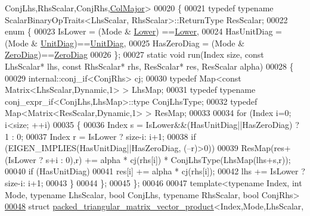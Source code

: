 \begin{DoxyCode}
      ConjLhs,RhsScalar,ConjRhs,\hyperlink{group__enums_ggaacded1a18ae58b0f554751f6cdf9eb13a0cbd4bdd0abcfc0224c5fcb5e4f6669a}{ColMajor}>
00020 \{
00021   \textcolor{keyword}{typedef} \textcolor{keyword}{typename} ScalarBinaryOpTraits<LhsScalar, RhsScalar>::ReturnType ResScalar;
00022   \textcolor{keyword}{enum} \{
00023     IsLower     = (Mode & \hyperlink{group__enums_gga39e3366ff5554d731e7dc8bb642f83cda891792b8ed394f7607ab16dd716f60e6}{Lower})   ==\hyperlink{group__enums_gga39e3366ff5554d731e7dc8bb642f83cda891792b8ed394f7607ab16dd716f60e6}{Lower},
00024     HasUnitDiag = (Mode & \hyperlink{group__enums_gga39e3366ff5554d731e7dc8bb642f83cdaddb72f888ac85d5a1c52333e54f9374b}{UnitDiag})==\hyperlink{group__enums_gga39e3366ff5554d731e7dc8bb642f83cdaddb72f888ac85d5a1c52333e54f9374b}{UnitDiag},
00025     HasZeroDiag = (Mode & \hyperlink{group__enums_gga39e3366ff5554d731e7dc8bb642f83cda884ff7240392e85aa6e4b3c957e36483}{ZeroDiag})==\hyperlink{group__enums_gga39e3366ff5554d731e7dc8bb642f83cda884ff7240392e85aa6e4b3c957e36483}{ZeroDiag}
00026   \};
00027   \textcolor{keyword}{static} \textcolor{keywordtype}{void} run(Index size, \textcolor{keyword}{const} LhsScalar* lhs, \textcolor{keyword}{const} RhsScalar* rhs, ResScalar* res, ResScalar alpha)
00028   \{
00029     internal::conj\_if<ConjRhs> cj;
00030     \textcolor{keyword}{typedef} Map<const Matrix<LhsScalar,Dynamic,1> > LhsMap;
00031     \textcolor{keyword}{typedef} \textcolor{keyword}{typename} conj\_expr\_if<ConjLhs,LhsMap>::type ConjLhsType;
00032     \textcolor{keyword}{typedef} Map<Matrix<ResScalar,Dynamic,1> > ResMap;
00033 
00034     \textcolor{keywordflow}{for} (Index i=0; i<size; ++i)
00035     \{
00036       Index s = IsLower&&(HasUnitDiag||HasZeroDiag) ? 1 : 0;
00037       Index r = IsLower ? size-i: i+1;
00038       \textcolor{keywordflow}{if} (EIGEN\_IMPLIES(HasUnitDiag||HasZeroDiag, (--r)>0))
00039     ResMap(res+(IsLower ? s+i : 0),r) += alpha * cj(rhs[i]) * ConjLhsType(LhsMap(lhs+s,r));
00040       \textcolor{keywordflow}{if} (HasUnitDiag)
00041     res[i] += alpha * cj(rhs[i]);
00042       lhs += IsLower ? size-i: i+1;
00043     \}
00044   \};
00045 \};
00046 
00047 \textcolor{keyword}{template}<\textcolor{keyword}{typename} Index, \textcolor{keywordtype}{int} Mode, \textcolor{keyword}{typename} LhsScalar, \textcolor{keywordtype}{bool} ConjLhs, \textcolor{keyword}{typename} RhsScalar, \textcolor{keywordtype}{bool} ConjRhs>
\hyperlink{structinternal_1_1packed__triangular__matrix__vector__product_3_01_index_00_01_mode_00_01_lhs_sc27c8536a613da6e5ab28fe48015c06ef}{00048} \textcolor{keyword}{struct }\hyperlink{structinternal_1_1packed__triangular__matrix__vector__product}{packed\_triangular\_matrix\_vector\_product}<Index,Mode,LhsScalar,

\end{DoxyCode}
